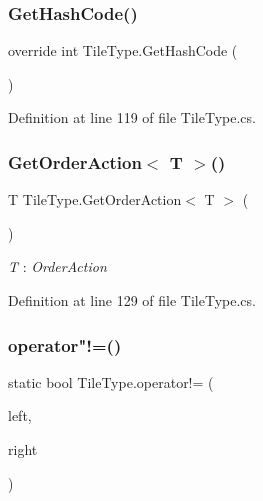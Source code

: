 \mbox{\label{class_tile_type_a29b7914ec11c89facbca91e69b8a2420}} 
\subsubsection{\texorpdfstring{Get\+Hash\+Code()}{GetHashCode()}}
{\footnotesize\ttfamily override int Tile\+Type.\+Get\+Hash\+Code (\begin{DoxyParamCaption}{ }\end{DoxyParamCaption})}



Definition at line 119 of file Tile\+Type.\+cs.

\mbox{\label{class_tile_type_a9385c11a23951c3fd8d357631be69b7e}} 
\subsubsection{\texorpdfstring{Get\+Order\+Action$<$ T $>$()}{GetOrderAction< T >()}}
{\footnotesize\ttfamily T Tile\+Type.\+Get\+Order\+Action$<$ T $>$ (\begin{DoxyParamCaption}{ }\end{DoxyParamCaption})}

\begin{Desc}
\item[Type Constraints]\begin{description}
\item[{\em T} : {\em Order\+Action}]\end{description}
\end{Desc}


Definition at line 129 of file Tile\+Type.\+cs.

\mbox{\label{class_tile_type_a9f34d34dd04b6ff5b6141db70f8e0c48}} 
\subsubsection{\texorpdfstring{operator"!=()}{operator!=()}}
{\footnotesize\ttfamily static bool Tile\+Type.\+operator!= (\begin{DoxyParamCaption}\item[{\hyperlink{class_tile_type}{Tile\+Type}}]{left,  }\item[{\hyperlink{class_tile_type}{Tile\+Type}}]{right }\end{DoxyParamCaption})\hspace{0.3cm}{\ttfamily [static]}}



